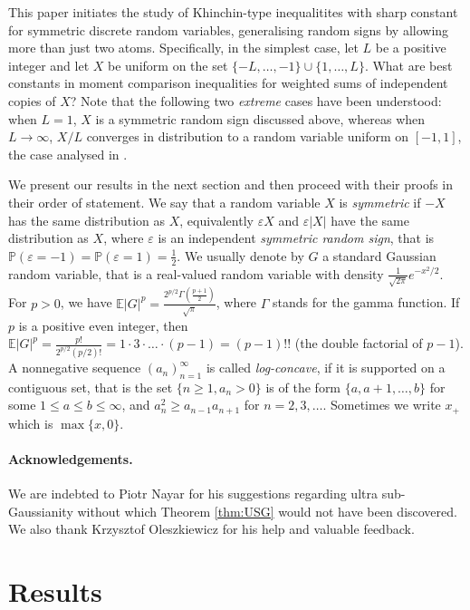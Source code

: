 \documentclass[10pt]{article}
\newcommand{\E}{\mathbb{E}}
\newcommand{\1}{\textbf{1}}
\newcommand{\p}[1]{\mathbb{P}\left( #1 \right)}
\theoremstyle{remark}
\theoremstyle{definition}
\begin{document}
This paper initiates the study of Khinchin-type inequalitites with sharp constant for symmetric discrete random variables, generalising random signs by allowing more than just two atoms. Specifically, in the simplest case, let $L$ be a positive integer and let $X$ be uniform on the set $\{-L,\ldots,-1\}\cup\{1,\ldots,L\}$. What are best constants in moment comparison inequalities for weighted sums of independent copies of $X$? Note that the following two \emph{extreme} cases have been understood: when $L=1$, $X$ is a symmetric random sign discussed above, whereas when $L \to \infty$, $X/L$ converges in distribution to a random variable uniform on $[-1,1]$, the case analysed in \cite{LO}. 

We present our results in the next section and then proceed with their proofs in their order of statement. We say that a random variable $X$ is \emph{symmetric} if $-X$ has the same distribution as $X$, equivalently $\varepsilon X$ and $\varepsilon|X|$ have the same distribution as $X$, where $\varepsilon$ is an independent \emph{symmetric random sign}, that is $\p{\varepsilon = -1} = \p{\varepsilon = 1} = \frac{1}{2}$. We usually denote by $G$ a standard Gaussian random variable, that is a real-valued random variable with density $\frac{1}{\sqrt{2\pi}}e^{-x^2/2}$. For $p > 0$, we have $\E|G|^p = \frac{2^{p/2}\Gamma\left(\frac{p+1}{2}\right)}{\sqrt{\pi}}$, where $\Gamma$ stands for the gamma function. If $p$ is a positive even integer, then $\E|G|^p = \frac{p!}{2^{p/2}(p/2)!} = 1\cdot 3\cdot \ldots \cdot (p-1) = (p-1)!!$ (the double factorial of $p-1$). A nonnegative sequence $(a_n)_{n=1}^\infty$ is called \emph{log-concave}, if it is supported on a contiguous set, that is the set $\{n \geq 1, a_n > 0\}$ is of the form $\{a,a+1,\dots,b\}$ for some $1 \leq a \leq b \leq \infty$, and $a_n^2 \geq a_{n-1}a_{n+1}$ for $n=2,3,\ldots$. Sometimes we write $x_+$ which is $\max\{x,0\}$.



\paragraph{Acknowledgements.} We are indebted to Piotr Nayar for his suggestions regarding ultra sub-Gaussianity without which Theorem \ref{thm:USG} would not have been discovered. We also thank Krzysztof Oleszkiewicz for his help and valuable feedback.




\section{Results}
\end{document}
